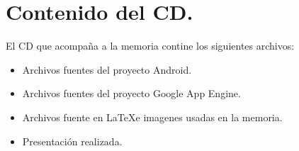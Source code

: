 \chapter{Contenido del CD.}\label{cap:contenidoCD}

El CD que acompaña a la memoria contine los siguientes archivos:

\begin{itemize}

\item{Archivos fuentes del proyecto Android.}
\item{Archivos fuentes del proyecto Google App Engine.}
\item{Archivos fuente en \LaTeX e imagenes usadas en la memoria.}
\item{Presentación realizada.}

\end{itemize}

